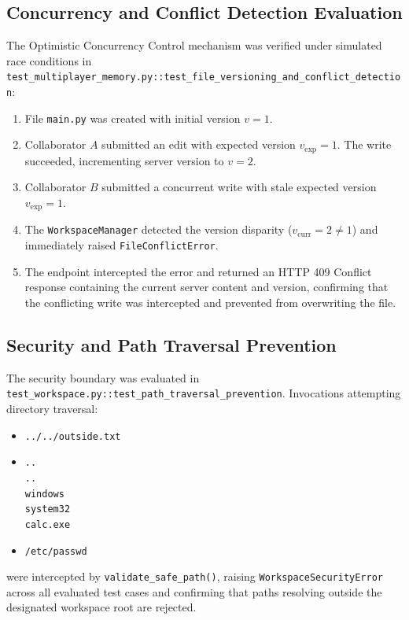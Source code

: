 \documentclass[conference]{IEEEtran}
\begin{document}
\subsection{Concurrency and Conflict Detection Evaluation}
The Optimistic Concurrency Control mechanism was verified under simulated race conditions in \texttt{test\_multiplayer\_memory.py::test\_file\_versioning\_and\_conflict\_detection}:
\begin{enumerate}
    \item File \texttt{main.py} was created with initial version $v=1$.
    \item Collaborator $A$ submitted an edit with expected version $v_{\text{exp}} = 1$. The write succeeded, incrementing server version to $v=2$.
    \item Collaborator $B$ submitted a concurrent write with stale expected version $v_{\text{exp}} = 1$.
    \item The \texttt{WorkspaceManager} detected the version disparity ($v_{\text{curr}} = 2 \neq 1$) and immediately raised \texttt{FileConflictError}.
    \item The endpoint intercepted the error and returned an HTTP 409 Conflict response containing the current server content and version, confirming that the conflicting write was intercepted and prevented from overwriting the file.
\end{enumerate}

\subsection{Security and Path Traversal Prevention}
The security boundary was evaluated in \texttt{test\_workspace.py::test\_path\_traversal\_prevention}. Invocations attempting directory traversal:
\begin{itemize}
    \item \texttt{../../outside.txt}
    \item \texttt{..\\..\\windows\\system32\\calc.exe}
    \item \texttt{/etc/passwd}
\end{itemize}
were intercepted by \texttt{validate\_safe\_path()}, raising \texttt{WorkspaceSecurityError} across all evaluated test cases and confirming that paths resolving outside the designated workspace root are rejected.
\end{document}

